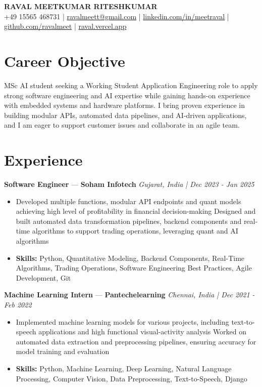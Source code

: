 \documentclass[a4paper,10pt]{article}
\begin{document}
\begin{center}
  {\Large\bfseries RAVAL MEETKUMAR RITESHKUMAR}\\[2pt]
  {\small +49 15565 468731 \;|\; \href{mailto:ravalmeett@gmail.com}{ravalmeett@gmail.com} \;|\; \href{https://www.linkedin.com/in/meetraval/}{linkedin.com/in/meetraval} \;|\; \href{https://github.com/ravalmeet}{github.com/ravalmeet} \;|\; \href{https://raval.vercel.app/}{raval.vercel.app}}
\end{center}
\vspace{-3pt}

\section*{Career Objective}
MSc AI student seeking a Working Student Application Engineering role to apply strong software engineering and AI expertise while gaining hands-on experience with embedded systems and hardware platforms. I bring proven experience in building modular APIs, automated data pipelines, and AI-driven applications, and I am eager to support customer issues and collaborate in an agile team.\par

\section*{Experience}
\textbf{Software Engineer} — \textbf{Soham Infotech} \hfill \textit{Gujarat, India \;|\; Dec 2023 - Jan 2025}\par
\vspace{1pt}
\begin{itemize}
  \item Developed multiple functions, modular API endpoints and quant models achieving high level of profitability in financial decision-making Designed and built automated data transformation pipelines, backend components and real-time algorithms to support trading operations, leveraging quant and AI algorithms
  \item \textbf{Skills:} Python, Quantitative Modeling, Backend Components, Real-Time Algorithms, Trading Operations, Software Engineering Best Practices, Agile Development, Git
\end{itemize}
\vspace{3pt}
\textbf{Machine Learning Intern} — \textbf{Pantechelearning} \hfill \textit{Chennai, India \;|\; Dec 2021 - Feb 2022}\par
\vspace{1pt}
\begin{itemize}
  \item Implemented machine learning models for various projects, including text-to-speech applications and high functional visual-activity analysis Worked on automated data extraction and preprocessing pipelines, ensuring accuracy for model training and evaluation
  \item \textbf{Skills:} Python, Machine Learning, Deep Learning, Natural Language Processing, Computer Vision, Data Preprocessing, Text-to-Speech, Django
\end{itemize}
\end{document}
